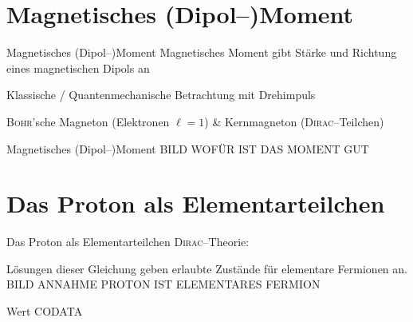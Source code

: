 \documentclass[t,9pt]{beamer}
\newcommand{\td}{\text{d}}
\begin{document}
        \section{Magnetisches (Dipol--)Moment}
        \begin{frame}{Magnetisches (Dipol--)Moment}
                \pause
                Magnetisches Moment gibt Stärke und Richtung eines magnetischen Dipols an
                \begin{center}
                        \tcboxmath{\boldsymbol{m}=\dfrac{1}{2}\int_{}^{}\td ^3r\left[\boldsymbol{r}\times \boldsymbol{j}\left(\boldsymbol{r}\right)\right]\qquad \vv{m}=I\cdot\boldsymbol{A}}
                \end{center}
                \pause
                Klassische / Quantenmechanische Betrachtung mit Drehimpuls
                \begin{center}
                \end{center}
                \pause
                \textsc{Bohr}'sche Magneton (Elektronen $\ell=1$) \& Kernmagneton (\textsc{Dirac}--Teilchen)
                \begin{center}
                \end{center}
        \end{frame}

        \begin{frame}{Magnetisches (Dipol--)Moment}
                BILD WOFÜR IST DAS MOMENT GUT
        \end{frame}

        \section{Das Proton als Elementarteilchen}
        \begin{frame}{Das Proton als Elementarteilchen}
                \textsc{Dirac}--Theorie: 
                \begin{center}
                \end{center}
                Lösungen dieser Gleichung geben erlaubte Zustände für elementare Fermionen an.
                \pause
                \\ BILD ANNAHME PROTON IST ELEMENTARES FERMION
                \pause
                \begin{center}
                \end{center}
                Wert CODATA\cite{CODATA_nuclear_magneton}
        \end{frame}
\end{document}
